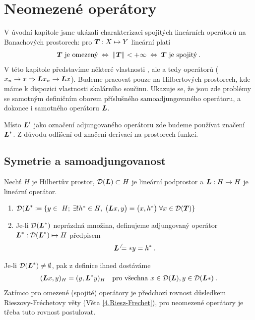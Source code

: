 \section{Neomezené operátory}
V úvodní kapitole jsme ukázali charakterizaci spojitých lineárních operátorů na Banachových prostorech: pro $\boldsymbol{T} :X \mapsto Y$ lineární platí \begin{align*}
    \boldsymbol{T} \text{ je omezený} \;\Leftrightarrow\; \left\lVert\boldsymbol{T}\right\rVert < +\infty \;\Leftrightarrow\; \boldsymbol{T} \text{ je spojitý} \:.
\end{align*}
V této kapitole představíme některé vlastnosti , ale  a tedy  operátorů ($ x_n \rightarrow x \Rightarrow \boldsymbol{L} x_n \rightarrow \boldsymbol{L} x$).
Budeme pracovat pouze na Hilbertových prostorech, kde máme k dispozici vlastnosti skalárního součinu. Ukazuje se, že jsou zde problémy se samotným definičním oborem příslušného samoadjungovaného operátoru, a dokonce i samotného operátoru $\boldsymbol{L}$.

\Poznamka

Místo $\boldsymbol{L}'$ jako označení adjungovaného operátoru zde budeme používat značení $\boldsymbol{L}^*$. Z důvodu odlišení od značení derivací na prostorech funkcí.

\subsection{Symetrie a samoadjungovanost}
\begin{definition}
Nechť $H$ je Hilbertův prostor, $\mathcal{D}(\boldsymbol{L}) \subset H$ je lineární podprostor a $\boldsymbol{L} : H \mapsto H$ je lineární operátor.
\begin{enumerate}
    \item $\mathcal{D}(\map L^*\coloneqq\{y\in\ H;\;\exists!h^*\in H,\;\innerprod{\map Lx}{y}=\innerprod{x}{h^*}\;\forall x\in\mathcal{D}(\map T)\}$
    \item Je-li $\mathcal{D}(\boldsymbol{L}^*)$ neprázdná množina, definujeme adjungovaný operátor $\boldsymbol{L}^* : \mathcal{D}(\boldsymbol{L}^*) \mapsto H$ předpisem \begin{align*}
        \boldsymbol{L}^\neq* y = h^* \:.
    \end{align*}
\end{enumerate}
\end{definition}

\begin{remark}
Je-li $\mathcal{D}(\boldsymbol{L}^*) \neq \emptyset$, pak z definice ihned dostáváme \begin{align*}
    (\boldsymbol{L} x,y)_H =(y, \boldsymbol{L}^* y)_H \quad \text{pro všechna } x \in \mathcal{D}(\boldsymbol{L}), y \in \mathcal{D}(\boldsymbol{L}*) \:.
\end{align*}
Zatímco pro omezené (spojité) operátory je předchozí rovnost důsledkem Rieszovy-Fréchetovy věty (Věta \ref{4.Riesz-Frechet}), pro neomezené operátory je třeba tuto rovnost postulovat.
\end{remark}

